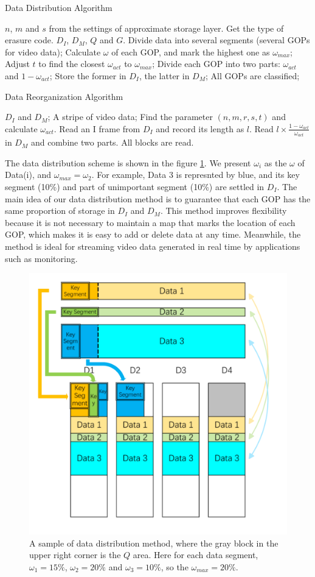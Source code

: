 \documentclass[sigconf]{acmart}
\begin{document}
\begin{algorithm}[htb] 
\caption{Data Distribution Algorithm} 
\label{alg-data-dist} 
\begin{algorithmic}[1] 

\Require  $n$, $m$ and $s$ from the settings of approximate storage layer. Get the type of erasure code.
\Ensure $D_I$, $D_M$, $Q$ and $G$.
\State Divide data into several segments (several GOPs for video data);
\State Calculate $\omega$ of each GOP, and mark the highest one as $\omega_{max}$;
\State Adjust $t$ to find the closest $\omega_{act}$ to $\omega_{max}$;
\Repeat 
\State Divide each GOP into two parts: $\omega_{act}$ and $1-\omega_{act}$;
\State Store the former in $D_I$, the latter in $D_M$;
\Until All GOPs are classified;
\EndWhile

\end{algorithmic} 
\end{algorithm}


\begin{algorithm}[htb] 
\caption{Data Reorganization Algorithm} 
\label{alg-data-reor} 
\begin{algorithmic}[1] 
\Require $D_I$ and $D_M$;
\Ensure A stripe of video data;
\State Find the parameter $(n,m,r,s,t)$ and calculate $\omega_{act}$.
\Repeat
\State Read an I frame from $D_I$ and record its length as $l$.
\State Read $l \times \frac{1-\omega_{act}}{\omega_{act}}$ in $D_M$ and combine two parts.
\Until All blocks are read.
\end{algorithmic} 
\end{algorithm}

The data distribution scheme is shown in the figure \ref{Data-distribution-v2}. We present $\omega_i$ as the $\omega$ of Data(i), and $\omega_{max} = \omega_2$.
For example, Data 3 is represnted by blue, and its key segment (10\%) and part of unimportant segment (10\%) are settled in $D_I$.
The main idea of our data distribution method is to guarantee that each GOP has the same proportion of storage in $D_I$ and $D_M$. This method improves flexibility because it is not necessary to maintain a map that marks the location of each GOP, which makes it is easy to add or delete data at any time. Meanwhile, the method is ideal for streaming video data generated in real time by applications such as monitoring.

\begin{figure}[htb]
\centering
\includegraphics[width=0.32 \textwidth]{photo/Data-distribution-v2.pdf}
\caption{A sample of data distribution method, where the gray block in the upper right corner is the $Q$ area. Here for each data segment, $\omega_1=15\%$, $\omega_2=20\%$ and $\omega_3=10\%$, so the $\omega_{max}=20\%$.}
\label{Data-distribution-v2}
\end{figure}
\end{document}
